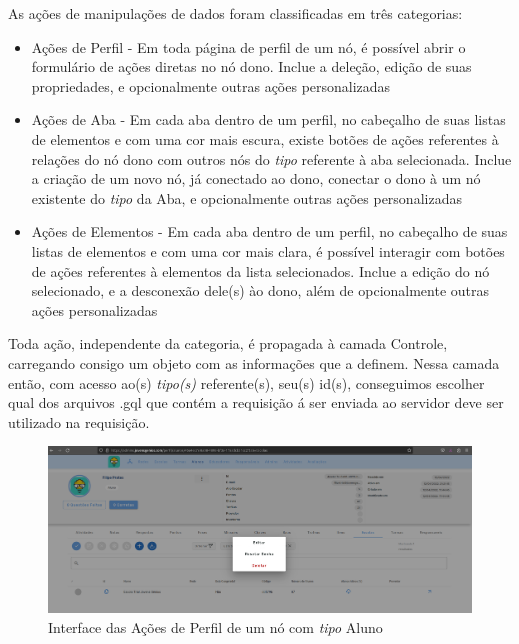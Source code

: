 As ações de manipulações de dados foram classificadas em três categorias:
\begin{itemize}
    \item Ações de Perfil - Em toda página de perfil de um nó, é possível abrir o formulário de ações diretas no nó dono. Inclue a deleção, edição de suas propriedades, e opcionalmente outras ações personalizadas
    \item Ações de Aba - Em cada aba dentro de um perfil, no cabeçalho de suas listas de elementos e com uma cor mais escura, existe botões de ações referentes à relações do nó dono com outros nós do \textit{tipo} referente à aba selecionada. Inclue a criação de um novo nó, já conectado ao dono, conectar o dono à um nó existente do \textit{tipo} da Aba, e opcionalmente outras ações personalizadas
    \item Ações de Elementos - Em cada aba dentro de um perfil, no cabeçalho de suas listas de elementos e com uma cor mais clara, é possível interagir com botões de ações referentes à elementos da lista selecionados. Inclue a edição do nó selecionado, e a desconexão dele(s) ào dono, além de opcionalmente outras ações personalizadas
\end{itemize}
Toda ação, independente da categoria, é propagada à camada Controle, carregando consigo um objeto com as informações que a definem. Nessa camada então, com acesso ao(s) \textit{tipo(s)} referente(s), seu(s) id(s), conseguimos escolher qual dos arquivos .gql que contém a requisição á ser enviada ao servidor deve ser utilizado na requisição.
\begin{figure}
    \centering
    \includegraphics[width=1\linewidth]{Imagens/chap04/front-profile-actions.png}
    \caption{Interface das Ações de Perfil de um nó com \textit{tipo} Aluno}
    \label{fig:enter-label}
\end{figure}

